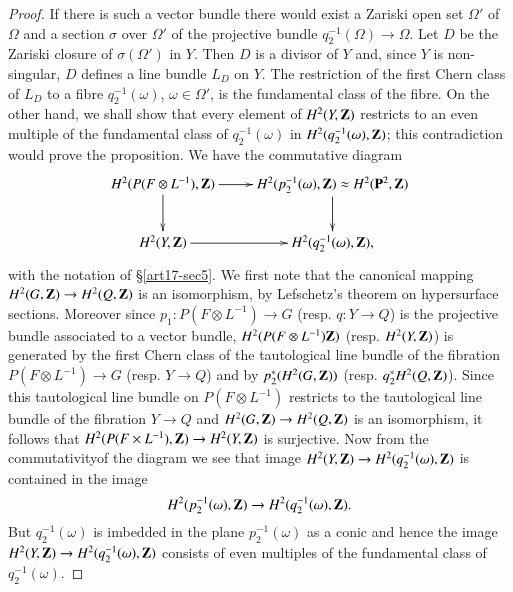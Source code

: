 \begin{proof}
If there is such a vector bundle there would exist a Zariski open set $\Omega'$ of $\Omega$ and a section $\sigma$ over $\Omega'$ of the projective bundle $q^{-1}_{2}(\Omega)\to \Omega$. Let $D$ be the Zariski closure of $\sigma(\Omega')$ in $Y$. Then $D$ is a divisor of $Y$ and, since $Y$ is non-singular, $D$ defines a line bundle $L_{D}$ on $Y$. The restriction of the first Chern class of $L_{D}$ to a fibre $q^{-1}_{2}(\omega)$, $\omega\in \Omega'$, is the fundamental class of the fibre. On the other hand, we shall show that every element of $H^{2}(Y,\mathbf{Z})$ restricts to an even multiple of the fundamental class of $q^{-1}_{2}(\omega)$ in $H^{2}(q^{-1}_{2}(\omega),\mathbf{Z})$; this contradiction would prove the proposition. We have the commutative diagram
\[
\xymatrix{
H^{2}(P(F\otimes L^{-1}),\bfZ)\ar[d]\ar[r] & H^{2}(p^{-1}_{2}(\omega),\bfZ)\approx H^{2}(\bfP^{2},\bfZ)\ar[d]\\
H^{2}(Y,\bfZ)\ar[r] & H^{2}(q^{-1}_{2}(\omega),\bfZ),
}
\]
with the notation of \S\ref{art17-sec5}. We first note that the canonical mapping\break $H^{2}(G,\mathbf{Z})\to H^{2}(Q,\mathbf{Z})$ is an isomorphism, by Lefschetz's theorem on hypersurface sections. Moreover since $p_{1}:P(F\otimes L^{-1})\to G$ (resp. $q:Y\to Q$) is the projective bundle associated to a vector bundle, $H^{2}(P(F\otimes L^{-1})\mathbf{Z})$ (resp. $H^{2}(Y,\mathbf{Z})$) is generated by the first Chern class of the tautological line bundle of the fibration $P(F\otimes L^{-1})\to G$ (resp. $Y\to Q$) and by $p^{*}_{2}(H^{2}(G,\mathbf{Z}))$ (resp. $q^{*}_{2}H^{2}(Q,\mathbf{Z})$). Since this tautological line bundle on $P(F\otimes L^{-1})$ restricts to the tautological line bundle of the fibration $Y\to Q$ and $H^{2}(G,\mathbf{Z})\to H^{2}(Q,\mathbf{Z})$ is an isomorphism, it follows that $H^{2}(P(F\times L^{-1}),\mathbf{Z})\to H^{2}(Y,\mathbf{Z})$ is surjective. Now from the commutativity\pageoriginale of the diagram we see that image $H^{2}(Y,\mathbf{Z})\to H^{2}(q^{-1}_{2}(\omega),\mathbf{Z})$ is contained in the image 
$$
H^{2}(p^{-1}_{2}(\omega),\mathbf{Z})\to H^{2}(q^{-1}_{2}(\omega),\mathbf{Z}).
$$ 
But $q^{-1}_{2}(\omega)$ is imbedded in the plane $p^{-1}_{2}(\omega)$ as a conic and hence the image $H^{2}(Y,\mathbf{Z})\to H^{2}(q^{-1}_{2}(\omega),\mathbf{Z})$ consists of even multiples of the fundamental class of $q^{-1}_{2}(\omega)$.
\end{proof}

